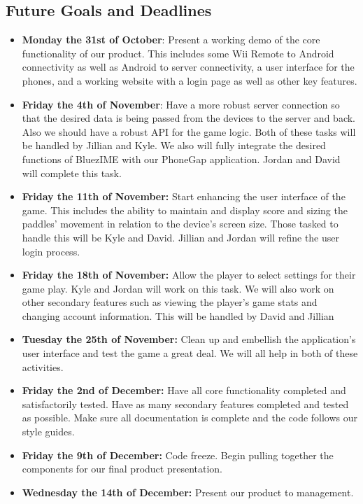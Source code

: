 \documentclass[12pt]{article}
\begin{document}
\subsection{Future Goals and Deadlines}
\begin{itemize}
\item \textbf{Monday the 31st of October}: Present a working demo of the core functionality of our product.  This includes some Wii Remote to Android connectivity as well as Android to server connectivity, a user interface for the phones, and a working website with a login page as well as other key features.

\item \textbf{Friday the 4th of November}: Have a more robust server connection so that the desired data is being passed from the devices to the server and back.  Also we should have a robust API for the game logic.  Both of these tasks will be handled by Jillian and Kyle.  We also will fully integrate the desired functions of BluezIME with our PhoneGap application.  Jordan and David will complete this task.

\item \textbf{Friday the 11th of November:} Start enhancing the user interface of the game.  This includes the ability to maintain and display score and sizing the paddles' movement in relation to the device’s screen size.  Those tasked to handle this will be Kyle and David.  Jillian and Jordan will refine the user login process.

\item \textbf{Friday the 18th of November:} Allow the player to select settings for their game play.  Kyle and Jordan will work on this task. We will also work on other secondary features such as viewing the player’s game stats and changing account information.  This will be handled by David and Jillian

\item \textbf{Tuesday the 25th of November:} Clean up and embellish the application’s user interface and test the game a great deal.  We will all help in both of these activities. 

\item \textbf{Friday the 2nd of December:} Have all core functionality completed and satisfactorily tested.  Have as many secondary features completed and tested as possible.  Make sure all documentation is complete and the code follows our style guides. 

\item \textbf{Friday the 9th of December:} Code freeze.  Begin pulling together the components for our final product presentation.

\item \textbf{Wednesday the 14th of December:}  Present our product to management.
\end{itemize}



\newpage


\end{document}
